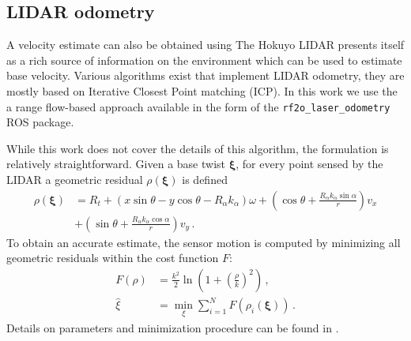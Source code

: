 \documentclass[times, utf8, diplomski, english]{fer}
\begin{document}
\subsection{LIDAR odometry}\label{subsection:lidar_odometry}
A velocity estimate can also be obtained using 
The Hokuyo LIDAR presents itself as a rich source of information on the environment which can be used to estimate base velocity.
Various algorithms exist that implement LIDAR odometry, they are mostly based on Iterative Closest Point matching (ICP).
In this work we use the a range flow-based approach available in the form of the \verb|rf2o_laser_odometry| ROS package.

While this work does not cover the details of this algorithm, the formulation is relatively straightforward.
Given a base twist $\mathbf{\xi}$, for every point sensed by the LIDAR a geometric residual $\rho\left(\mathbf{\xi}\right)$ is defined 
\begin{equation}
\begin{split}
\rho\left(\mathbf{\xi}\right) &= R_t + \left(x\sin\theta - y\cos\theta - R_\alpha k_\alpha\right)\omega + \left(\cos\theta + \frac{R_\alpha k_\alpha \sin\alpha}{r}\right)v_x \\
 &+ \left(\sin\theta + \frac{R_\alpha k_\alpha \cos\alpha}{r}\right)v_y\, .
 \end{split}
\end{equation}
To obtain an accurate estimate, the sensor motion is computed by minimizing all geometric residuals within the cost function $F$:
\begin{align}
F\left(\rho\right) &= \frac{k^2}{2}\ln{\left(1 + \left(\frac{\rho}{k}\right)^2\right)}\, , \\
\hat{\xi} &= \min\limits_{\xi} \sum\limits_{i=1}^{N} F \left(\rho_i \left( \mathbf{\xi} \right) \right)\, .
\end{align}
Details on parameters and minimization procedure can be found in \citep{jaimez2016planar}.
\end{document}
